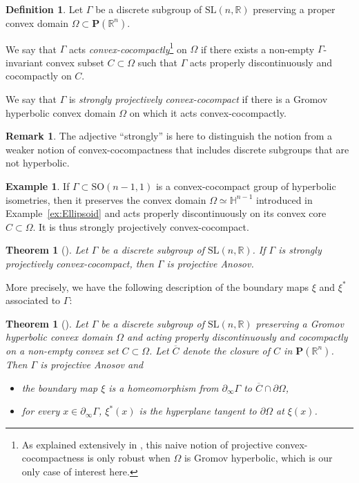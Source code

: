\documentclass[11pt]{article}
\numberwithin{equation}{section}
\newtheorem{theorem}[theo]{Theorem}
\theoremstyle{definition}
\newtheorem{defi}[theo]{Definition}
\newtheorem{example}[theo]{Example}
\newtheorem{rmk}[theo]{Remark}
\newcommand{\proj}{\mathbf{P}}
\newcommand{\R}{\mathbb{R}}
\newcommand{\Hyp}{\mathbb{H}}
\newcommand{\SL}{\mathrm{SL}}
\newcommand{\SO}{\mathrm{SO}}
\let\G\Gamma
\begin{document}
\begin{defi}\label{def - convex cocompact}
Let $\Gamma$ be a discrete subgroup of $\SL(n,\R)$ preserving a proper convex domain $\Omega\subset \proj(\R^n)$.

We say that $\Gamma$ acts \emph{convex-cocompactly}\footnote{As explained extensively in \cite{DGK}, this naive notion of projective convex-cocompactness is only robust when $\Omega$ is Gromov hyperbolic, which is our only case of interest here.} on $\Omega$ if there exists a non-empty $\Gamma$\nobreakdash-in\-vari\-ant convex subset $C\subset \Omega$ such that $\Gamma$ acts properly discontinuously and cocompactly on $C$.

We say that $\Gamma$ is \emph{strongly projectively convex-cocompact} if there is a Gromov hyperbolic convex domain $\Omega$ on which it acts convex-cocompactly.
\end{defi}

\begin{rmk}
The adjective ``strongly'' is here to distinguish the notion from a weaker notion of convex-cocompactness that includes discrete subgroups that are not hyperbolic.
\end{rmk}

\begin{example}
If $\Gamma \subset \SO(n-1,1)$ is a convex-cocompact group of hyperbolic isometries, then it preserves the convex domain $\Omega \simeq \Hyp^{n-1}$ introduced in Example~\ref{ex:Ellipsoid} and acts properly discontinuously on its convex core $C \subset \Omega$. It is thus strongly projectively convex-cocompact.
\end{example}

\begin{theorem}[\cite{DGK}]
Let $\G$ be a discrete subgroup of $\SL(n,\R)$. If $\G$ is strongly projectively convex-cocompact, then $\G$ is projective Anosov.
\end{theorem}

More precisely, we have the following description of the boundary maps $\xi$ and $\xi^*$ associated to $\Gamma$:

\begin{theorem}[\cite{DGK}] \label{theo - BoundaryMapsConvexCocompact}
Let $\Gamma$ be a discrete subgroup of $\SL(n,\R)$ preserving a Gromov hyperbolic convex domain $\Omega$ and acting properly discontinuously and cocompactly on a non-empty convex set $C\subset \Omega$. Let $\overline{C}$ denote the closure of $C$ in $\proj(\R^n)$. Then $\Gamma$ is projective Anosov and
\begin{itemize}
\item the boundary map $\xi$ is a homeomorphism from $\partial_\infty \Gamma$ to $\overline{C} \cap \partial \Omega$,
\item for every $x\in \partial_\infty \Gamma$, $\xi^*(x)$ is the hyperplane tangent to $\partial \Omega$ at $\xi(x)$.
\end{itemize}
\end{theorem}
\end{document}
